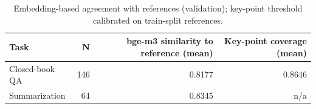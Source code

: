 \begin{table}[t]
\centering
\caption{Embedding-based agreement with references (validation); key-point threshold calibrated on train-split references.}
\label{tab:t8_semantic_agreement}
\begin{tabular}{lrrr}
\toprule
Task & N & bge-m3 similarity to reference (mean) & Key-point coverage (mean) \\
\midrule
Closed-book QA & 146 & 0.8177 & 0.8646 \\
Summarization & 64 & 0.8345 & n/a \\
\bottomrule
\end{tabular}
\end{table}
